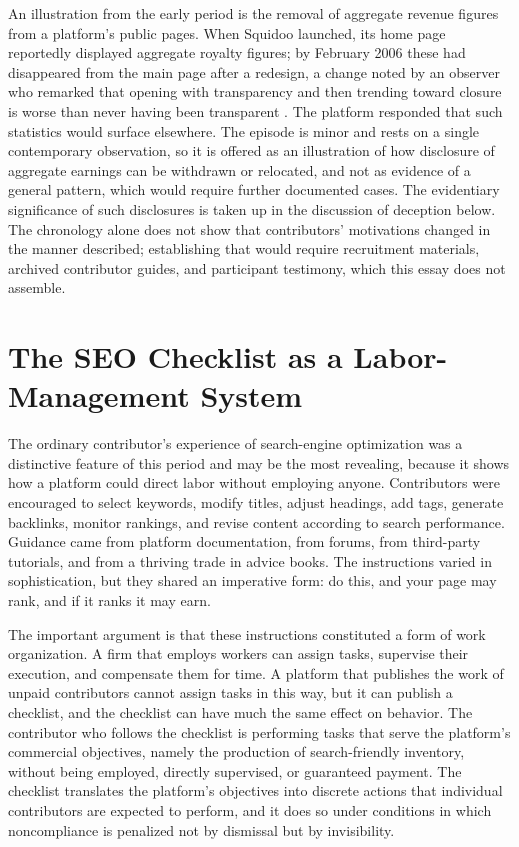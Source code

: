 \documentclass[11pt]{article}
\theoremstyle{remark}
\begin{document}
An illustration from the early period is the removal of aggregate revenue figures from a platform's public pages. When Squidoo launched, its home page reportedly displayed aggregate royalty figures; by February 2006 these had disappeared from the main page after a redesign, a change noted by an observer who remarked that opening with transparency and then trending toward closure is worse than never having been transparent \cite{fried2006}. The platform responded that such statistics would surface elsewhere. The episode is minor and rests on a single contemporary observation, so it is offered as an illustration of how disclosure of aggregate earnings can be withdrawn or relocated, and not as evidence of a general pattern, which would require further documented cases. The evidentiary significance of such disclosures is taken up in the discussion of deception below. The chronology alone does not show that contributors' motivations changed in the manner described; establishing that would require recruitment materials, archived contributor guides, and participant testimony, which this essay does not assemble.

\section{The SEO Checklist as a Labor-Management System}

The ordinary contributor's experience of search-engine optimization was a distinctive feature of this period and may be the most revealing, because it shows how a platform could direct labor without employing anyone. Contributors were encouraged to select keywords, modify titles, adjust headings, add tags, generate backlinks, monitor rankings, and revise content according to search performance. Guidance came from platform documentation, from forums, from third-party tutorials, and from a thriving trade in advice books. The instructions varied in sophistication, but they shared an imperative form: do this, and your page may rank, and if it ranks it may earn.

The important argument is that these instructions constituted a form of work organization. A firm that employs workers can assign tasks, supervise their execution, and compensate them for time. A platform that publishes the work of unpaid contributors cannot assign tasks in this way, but it can publish a checklist, and the checklist can have much the same effect on behavior. The contributor who follows the checklist is performing tasks that serve the platform's commercial objectives, namely the production of search-friendly inventory, without being employed, directly supervised, or guaranteed payment. The checklist translates the platform's objectives into discrete actions that individual contributors are expected to perform, and it does so under conditions in which noncompliance is penalized not by dismissal but by invisibility.
\end{document}
